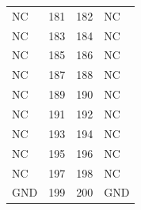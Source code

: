 \documentclass[12pt]{article}
\begin{document}
\begin{longtable}{P{2.5cm}P{1.5cm}P{1.5cm}P{2.5cm}}
 NC     & 181 & 182 & NC \\
 NC     & 183 & 184 & NC \\
 NC     & 185 & 186 & NC \\
 NC     & 187 & 188 & NC \\
 NC     & 189 & 190 & NC \\
 NC     & 191 & 192 & NC \\
 NC     & 193 & 194 & NC \\
 NC     & 195 & 196 & NC \\
 NC     & 197 & 198 & NC \\
 GND    & 199 & 200 & GND \\
\bottomrule
\end{longtable}
\end{document}
